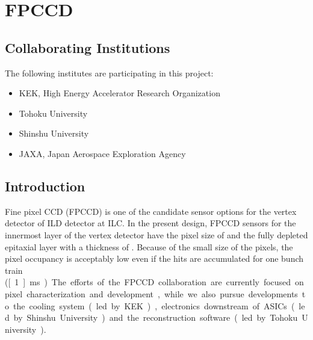 \section{FPCCD}
\subsection{Collaborating Institutions}
The following institutes are participating in this project:
\begin{itemize}
    \item KEK, High Energy Accelerator Research Organization
    \item Tohoku University
    \item Shinshu University
    \item JAXA, Japan Aerospace Exploration Agency
\end{itemize}
\subsection{Introduction}
    Fine pixel CCD (FPCCD) is one of the candidate sensor options for the vertex detector of ILD detector at ILC. In the present design, FPCCD sensors for the innermost layer of the vertex detector have the pixel size of \unit[5]{\micron} and the fully depleted epitaxial layer with a thickness of \unit[15]{\micron}. Because of the small size of the pixels, the pixel occupancy is acceptably low even if the hits are accumulated for one bunch train (\unit[~1]{ms}). 
    The efforts of the FPCCD collaboration are currently focused on pixel characterization and development, while we also pursue developments to the cooling system (led by KEK), electronics downstream of ASICs (led by Shinshu University) and the reconstruction software (led by Tohoku University).
